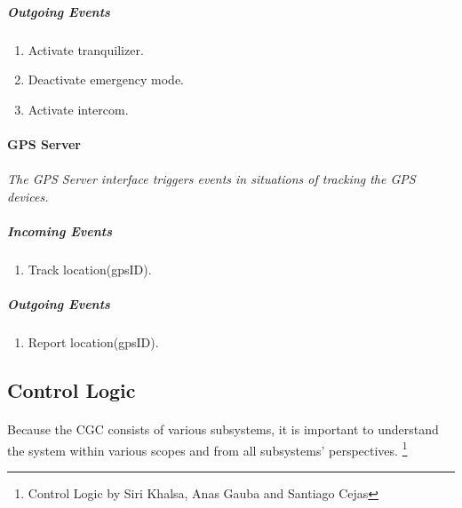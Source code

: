 \documentclass[12pt]{article}
\begin{document}
        \subparagraph{Outgoing Events}
        \begin{enumerate}
            \item Activate tranquilizer.
            \item Deactivate emergency mode.
            \item Activate intercom. 
        \end{enumerate}

    \paragraph{GPS Server}
    \paragraph{}\textit{The GPS Server interface triggers events in situations of tracking the GPS devices. }
        \subparagraph{Incoming Events}
        \begin{enumerate}
            \item Track location(gpsID).
        \end{enumerate}
                
        \subparagraph{Outgoing Events}
        \begin{enumerate}
            \item Report location(gpsID).
        \end{enumerate}                        
        
    \subsection{Control Logic} \label{logic}%
    \paragraph{} Because the CGC consists of various subsystems, it is important to understand 
    the system within various scopes and from all subsystems' perspectives. \footnote{Control 
    Logic by Siri Khalsa, Anas Gauba and Santiago Cejas}
\end{document}
